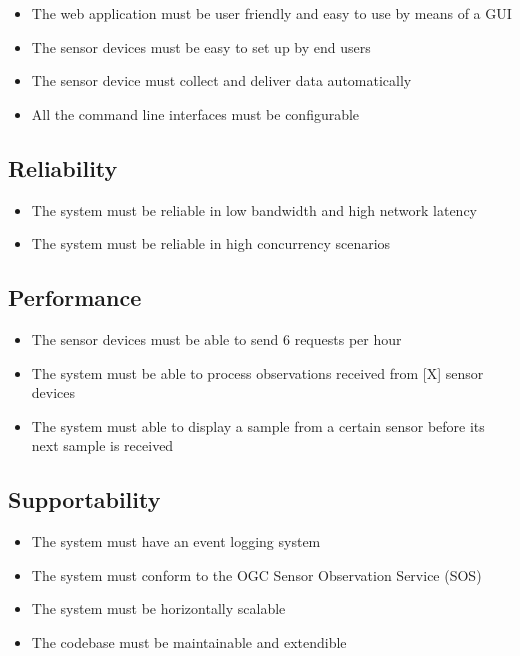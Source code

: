 \begin{itemize}
	\item The web application must be user friendly and easy to use by means of a GUI
	\item The sensor devices must be easy to set up by end users
	\item The sensor device must collect and deliver data automatically
	\item All the command line interfaces must be configurable
\end{itemize}

\subsection*{Reliability}

\begin{itemize}
	\item The system must be reliable in low bandwidth and high network latency
	\item The system must be reliable in high concurrency scenarios
\end{itemize}

\subsection*{Performance}

\begin{itemize}
	\item The sensor devices must be able to send 6 requests per hour
	\item The system must be able to process observations received from [X] sensor devices
	\item The system must able to display a sample from a certain sensor before its next sample is received
\end{itemize}

\subsection*{Supportability}

\begin{itemize}
	\item The system must have an event logging system
	\item The system must conform to the OGC Sensor Observation Service (SOS)
	\item The system must be horizontally scalable
	\item The codebase must be maintainable and extendible
\end{itemize}

